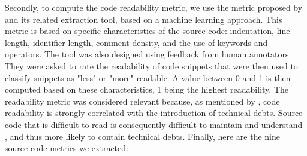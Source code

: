 
Secondly, to compute the code readability metric, we use the metric proposed by \citet{Buse:tse2010} and its related extraction tool, based on a machine learning approach. This metric is based on specific characteristics of the source code: indentation, line length, identifier length, comment density, and the use of keywords and operators. The tool was also designed using feedback from human annotators. They were asked to rate the readability of code snippets that were then used to classify snippets as "less" or "more" readable. A value between 0 and 1 is then computed based on these characteristics, 1 being the highest readability. The readability metric was considered relevant because, as mentioned by \citet{BavotaR16}, code readability is strongly correlated with the introduction of technical debts. Source code that is difficult to read is consequently difficult to maintain and understand \citep{Buse:tse2010}, and thus more likely to contain technical debts. Finally, here are the nine source-code metrics we extracted: \par

